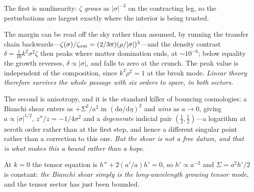 \documentclass[11pt,a4paper]{article}
\theoremstyle{plain}
\theoremstyle{definition}
\theoremstyle{remark}
\begin{document}
The first is nonlinearity: $\zeta$ \emph{grows} as $|\sigma|^{-3}$ on the contracting leg, so the perturbations are largest exactly where the interior is being trusted. 

The margin can be read off the sky rather than assumed, by running the transfer chain backwards---$\zeta(\sigma)/\zeta_{\rm out}=(2/3\pi)(\rho/|\sigma|)^3$---and the density contrast $\delta=\tfrac1{10}k^2\sigma^2\zeta$ then peaks where matter domination ends, at $\sim10^{-6}$; below equality the growth reverses, $\delta\propto|\sigma|$, and falls to zero at the crunch. The peak value is independent of the composition, since $k^2\rho^2=1$ at the break mode. \emph{Linear theory therefore survives the whole passage with six orders to spare, in both sectors.} 

The second is anisotropy, and it is the standard killer of bouncing cosmologies: a Bianchi shear enters as $+\Sigma^2/a^2$ in $(\mathrm{d}a/\mathrm{d}\eta)^2$ and \emph{wins} as $a\to0$, giving $a\propto|\sigma|^{1/2}$, $z''/z=-1/4\sigma^2$ and a \emph{degenerate} indicial pair $(\tfrac12,\tfrac12)$---a logarithm at zeroth order rather than at the first step, and hence a different singular point rather than a correction to this one. \emph{But the shear is not a free datum, and that is what makes this a bound rather than a hope.} 

At $k=0$ the tensor equation is $h''+2(a'/a)h'=0$, so $h'\propto a^{-2}$ and $\Sigma=a^2h'/2$ is constant: \emph{the Bianchi shear simply is the long-wavelength growing tensor mode}, and the tensor sector has just been bounded. 
\end{document}
